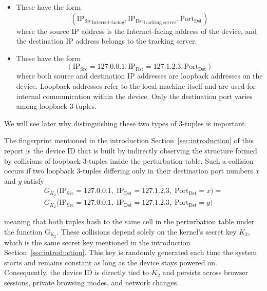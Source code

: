 \documentclass[twocolumn]{report}
\begin{document}
\begin{itemize}
	\item {} These have the form
	\begin{equation*}
		(\mathrm{IP_{Src}}_{\text{Internet-facing}}, \mathrm{IP_{Dst}}_{\text{tracking server}}, \mathrm{Port_{Dst}})
	\end{equation*}
	where the source IP address is the Internet-facing address of the device, and the destination IP address belongs to the tracking server.

	\item {} These have the form
	\begin{equation*}
		(\mathrm{IP_{Src}} = 127.0.0.1, \mathrm{IP_{Dst}} = 127.1.2.3, \mathrm{Port_{Dst}})
	\end{equation*}
	where both source and destination IP addresses are loopback addresses on the device. \alert{Loopback addresses} refer to the local machine itself and are used for internal communication within the device. Only the \alert{destination port} varies among loopback 3-tuples.
\end{itemize}

We will see later why distinguishing these two types of 3-tuples is important.

The fingerprint mentioned in the introduction Section~\ref{sec:introduction} of this report is the \alert{device ID} that is built by indirectly observing the structure formed by \alert{collisions of loopback 3-tuples} inside the perturbation table. Such a collision occurs if two loopback 3-tuples differing only in their destination port numbers $x$ and $y$ satisfy
\begin{equation*}
	\begin{split}
		G_{K_{2}}\bigl(
		\mathrm{IP}_{\mathrm{Src}} = 127.0.0.1,\;
		\mathrm{IP}_{\mathrm{Dst}} = 127.1.2.3,\;
		\mathrm{Port}_{\mathrm{Dst}} = x
		\bigr)
		= \\
		G_{K_{2}}\bigl(
		\mathrm{IP}_{\mathrm{Src}} = 127.0.0.1,\;
		\mathrm{IP}_{\mathrm{Dst}} = 127.1.2.3,\;
		\mathrm{Port}_{\mathrm{Dst}} = y
		\bigr)
	\end{split}
\end{equation*}
\vspace{-0.5cm}

meaning that both tuples hash to the same cell in the perturbation table under the function $\mathrm{G_{K_2}}$. These collisions depend solely on the kernel’s \alert{secret key} $K_2$, which is the same secret key mentioned in the introduction Section~\ref{sec:introduction}. This key is randomly generated each time the \alert{system starts} and remains constant as long as the device stays powered on. Consequently, the device ID is directly tied to $K_2$ and persists across browser sessions, private browsing modes, and network changes.
\end{document}

